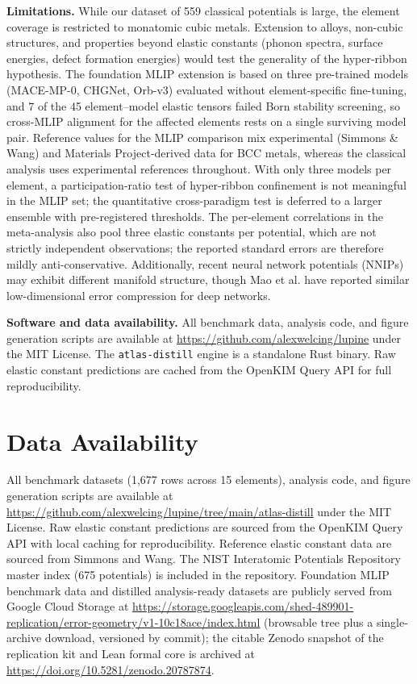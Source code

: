\documentclass[twocolumn,10pt]{article}
\begin{document}
\textbf{Limitations.} While our dataset of 559 classical potentials is large, the element coverage is restricted to monatomic cubic metals. Extension to alloys, non-cubic structures, and properties beyond elastic constants (phonon spectra, surface energies, defect formation energies) would test the generality of the hyper-ribbon hypothesis. The foundation MLIP extension is based on three pre-trained models (MACE-MP-0, CHGNet, Orb-v3) evaluated without element-specific fine-tuning, and 7 of the 45 element--model elastic tensors failed Born stability screening, so cross-MLIP alignment for the affected elements rests on a single surviving model pair. Reference values for the MLIP comparison mix experimental (Simmons \& Wang) and Materials Project-derived data for BCC metals, whereas the classical analysis uses experimental references throughout. With only three models per element, a participation-ratio test of hyper-ribbon confinement is not meaningful in the MLIP set; the quantitative cross-paradigm test is deferred to a larger ensemble with pre-registered thresholds\cite{welcing2026projection}. The per-element correlations in the meta-analysis also pool three elastic constants per potential, which are not strictly independent observations; the reported standard errors are therefore mildly anti-conservative. Additionally, recent neural network potentials (NNIPs) may exhibit different manifold structure, though Mao et al.\cite{mao2024,mao2026} have reported similar low-dimensional error compression for deep networks.

\textbf{Software and data availability.} All benchmark data, analysis code, and figure generation scripts are available at \url{https://github.com/alexwelcing/lupine} under the MIT License. The \texttt{atlas-distill} engine is a standalone Rust binary. Raw elastic constant predictions are cached from the OpenKIM Query API for full reproducibility.

\section*{Data Availability}

All benchmark datasets (1,677 rows across 15 elements), analysis code, and figure generation scripts are available at \url{https://github.com/alexwelcing/lupine/tree/main/atlas-distill} under the MIT License. Raw elastic constant predictions are sourced from the OpenKIM Query API\cite{openkim} with local caching for reproducibility. Reference elastic constant data are sourced from Simmons and Wang\cite{simmons1971}. The NIST Interatomic Potentials Repository master index (675 potentials) is included in the repository. Foundation MLIP benchmark data and distilled analysis-ready datasets are publicly served from Google Cloud Storage at \url{https://storage.googleapis.com/shed-489901-replication/error-geometry/v1-10c18ace/index.html} (browsable tree plus a single-archive download, versioned by commit); the citable Zenodo snapshot of the replication kit and Lean formal core is archived at \url{https://doi.org/10.5281/zenodo.20787874}.
\end{document}

